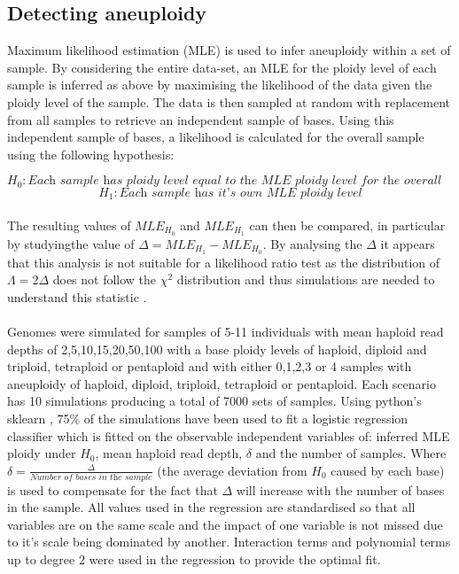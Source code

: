 \documentclass[11pt]{article}
\begin{document}
\subsection{Detecting aneuploidy}
Maximum likelihood estimation (MLE) is used to infer aneuploidy within a set of sample. By considering the entire data-set, an MLE for the ploidy level of each sample is inferred as above by maximising the likelihood of the data given the ploidy level of the sample. The data is then sampled at random with replacement from all samples to retrieve an independent sample of bases. Using this independent sample of bases, a likelihood is calculated for the overall sample using the following hypothesis:

\begin{equation*}
H_0: \textit{Each sample has ploidy level equal to the MLE ploidy level for the overall dataset}
\end{equation*}
\begin{equation*}
H_1: \textit{Each sample has it's own MLE ploidy level}
\end{equation*}

\paragraph{}The resulting values of $MLE_{H_{0} }$ and $MLE_{H_{1} }$ can then be compared, in particular by studyingthe value of $\Delta=MLE_{H_{1} }-MLE_{H_{0} }$. By analysing the $\Delta$ it appears that this analysis is not suitable for a likelihood ratio test as the distribution of $\Lambda=2\Delta$ does not follow the $\chi^2$ distribution and thus simulations are needed to understand this statistic \autocite{Pinheiro2000}. 

\paragraph{}Genomes were simulated for samples of 5-11 individuals with mean haploid read depths of 2,5,10,15,20,50,100 with a base ploidy levels of haploid, diploid and triploid, tetraploid or pentaploid and with either 0,1,2,3 or 4 samples with aneuploidy of haploid, diploid, triploid, tetraploid or pentaploid. Each scenario has 10 simulations producing a total of 7000 sets of samples. Using python's sklearn \autocite{Sklearn2011}, 75\% of the simulations have been used to fit a logistic regression classifier which is fitted on the observable independent variables of: inferred MLE ploidy under $H_0$, mean haploid read depth, $\delta$ and the number of samples. Where $\delta=\frac{\Delta}{\textit{Number of bases in the sample} }$  (the average deviation from $H_{0}$ caused by each base) is used to compensate for the fact that $\Delta$ will increase with the number of bases in the sample. All values used in the regression are standardised so that all variables are on the same scale and the impact of one variable is not missed due to it's scale being dominated by another. Interaction terms and polynomial terms up to degree 2 were used in the regression to provide the optimal fit.
\end{document}
